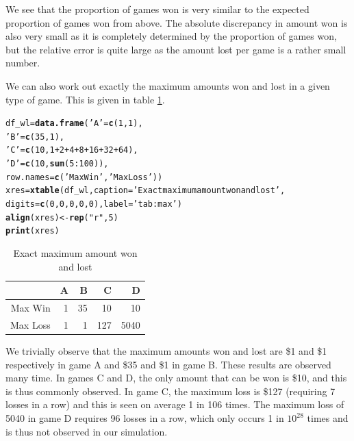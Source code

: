 \documentclass[12pt]{article}\usepackage[]{graphicx}\usepackage[]{color}
\makeatletter
\newcommand{\hlnum}[1]{\textcolor[rgb]{0.686,0.059,0.569}{#1}}%
\newcommand{\hlstr}[1]{\textcolor[rgb]{0.192,0.494,0.8}{#1}}%
\newcommand{\hlopt}[1]{\textcolor[rgb]{0,0,0}{#1}}%
\newcommand{\hlstd}[1]{\textcolor[rgb]{0.345,0.345,0.345}{#1}}%
\newcommand{\hlkwb}[1]{\textcolor[rgb]{0.69,0.353,0.396}{#1}}%
\newcommand{\hlkwc}[1]{\textcolor[rgb]{0.333,0.667,0.333}{#1}}%
\newcommand{\hlkwd}[1]{\textcolor[rgb]{0.737,0.353,0.396}{\textbf{#1}}}%
\newenvironment{kframe}{%
 \def\at@end@of@kframe{}%
 \ifinner\ifhmode%
  \def\at@end@of@kframe{\end{minipage}}%
  \begin{minipage}{\columnwidth}%
 \fi\fi%
 \def\FrameCommand##1{\hskip\@totalleftmargin \hskip-\fboxsep
 \colorbox{shadecolor}{##1}\hskip-\fboxsep
     \hskip-\linewidth \hskip-\@totalleftmargin \hskip\columnwidth}%
 \MakeFramed {\advance\hsize-\width
   \@totalleftmargin\z@ \linewidth\hsize
   \@setminipage}}%
 {\par\unskip\endMakeFramed%
 \at@end@of@kframe}
\makeatother
\begin{document}
We see that the proportion of games won is very similar to the expected proportion of games won from above. The absolute discrepancy in amount won is also very small as it is completely determined by the proportion of games won, but the relative error is quite large as the amount lost per game is a rather small number.

We can also work out exactly the maximum amounts won and lost in a given type of game. This is given in table \ref{tab:max}.

\begin{kframe}
\begin{alltt}
\hlstd{df_wl} \hlkwb{=} \hlkwd{data.frame}\hlstd{(}\hlstr{'A'} \hlstd{=} \hlkwd{c}\hlstd{(}\hlnum{1}\hlstd{,}\hlnum{1}\hlstd{),}
                   \hlstr{'B'} \hlstd{=} \hlkwd{c}\hlstd{(}\hlnum{35}\hlstd{,}\hlnum{1}\hlstd{),}
                    \hlstr{'C'} \hlstd{=} \hlkwd{c}\hlstd{(}\hlnum{10}\hlstd{,} \hlnum{1}\hlopt{+}\hlnum{2}\hlopt{+}\hlnum{4}\hlopt{+}\hlnum{8}\hlopt{+}\hlnum{16}\hlopt{+}\hlnum{32}\hlopt{+}\hlnum{64}\hlstd{),}
                   \hlstr{'D'} \hlstd{=} \hlkwd{c}\hlstd{(}\hlnum{10}\hlstd{,} \hlkwd{sum}\hlstd{(}\hlnum{5}\hlopt{:}\hlnum{100}\hlstd{)),}
                   \hlkwc{row.names} \hlstd{=} \hlkwd{c}\hlstd{(}\hlstr{'Max Win'}\hlstd{,} \hlstr{'Max Loss'}\hlstd{))}
\hlstd{xres} \hlkwb{=} \hlkwd{xtable}\hlstd{(df_wl,} \hlkwc{caption} \hlstd{=} \hlstr{'Exact maximum amount won and lost'}\hlstd{,}
              \hlkwc{digits} \hlstd{=} \hlkwd{c}\hlstd{(}\hlnum{0}\hlstd{,}\hlnum{0}\hlstd{,}\hlnum{0}\hlstd{,}\hlnum{0}\hlstd{,}\hlnum{0}\hlstd{),} \hlkwc{label}\hlstd{=}\hlstr{'tab:max'}\hlstd{)}
\hlkwd{align}\hlstd{(xres)} \hlkwb{<-} \hlkwd{rep}\hlstd{(}\hlstr{"r"}\hlstd{,} \hlnum{5}\hlstd{)}
\hlkwd{print}\hlstd{(xres)}
\end{alltt}
\end{kframe}%
\begin{table}[ht]
\centering
\begin{tabular}{rrrrr}
  \hline
 & A & B & C & D \\ 
  \hline
Max Win & 1 & 35 & 10 & 10 \\ 
  Max Loss & 1 & 1 & 127 & 5040 \\ 
   \hline
\end{tabular}
\caption{Exact maximum amount won and lost} 
\label{tab:max}
\end{table}


We trivially observe that the maximum amounts won and lost are \$1 and \$1 respectively in game A and \$35 and \$1 in game B. These results are observed many time. In games C and D, the only amount that can be won is \$10, and this is thus commonly observed. In game C, the maximum loss is \$127 (requiring 7 losses in a row) and this is seen on average 1 in 106 times. The maximum loss of 5040 in game D requires 96 losses in a row, which only occurs 1 in $10^{28}$ times and is thus not observed in our simulation.
\end{document}
